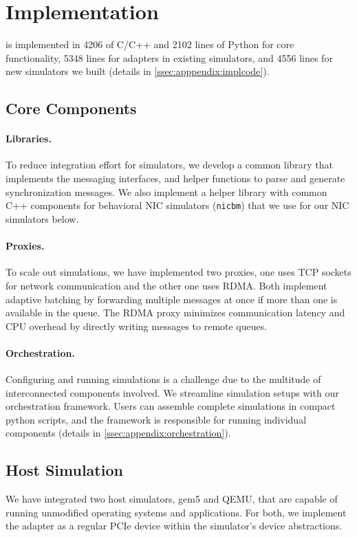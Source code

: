 \section{Implementation}
\label{sec:impl}

\sysname is implemented in 4206 of C/C++ and 2102 lines of Python for
core functionality, 5348 lines for adapters in existing simulators,
and 4556 lines for new simulators we built (details in
\autoref{ssec:apppendix:implcode}).

\subsection{Core \sysname Components}
\label{ssec:impl:library}
\paragraph{Libraries.}
To reduce integration effort for simulators, we develop a common
library that implements the \sysname messaging interfaces, and
helper functions to parse and generate synchronization messages.
%
We also implement a helper library with common C++ components for
behavioral NIC simulators (\texttt{nicbm}) that we use for
our NIC simulators below.

\paragraph{Proxies.}
To scale out \sysname simulations,
%
we have implemented two proxies, one uses TCP sockets for network
communication and the other one uses RDMA.
%
Both implement adaptive batching by forwarding multiple messages at once if more
than one is available in the queue.
%
The RDMA proxy minimizes communication latency and CPU overhead by directly
writing messages to remote queues.

\paragraph{Orchestration.}
Configuring and running \sysname simulations is a challenge due to the multitude
of interconnected components involved.
%
We streamline simulation setups with our orchestration framework.
%
Users can assemble complete simulations in compact python scripts, and the
framework is responsible for running individual components (details in
\autoref{ssec:appendix:orchestration}).


\subsection{Host Simulation}
\label{ssec:impl:host}
We have integrated two host simulators, gem5 and QEMU, that are capable of
running unmodified operating systems and applications.
%
For both, we implement the \sysname adapter as a regular PCIe device
within the simulator's device abstractions.



